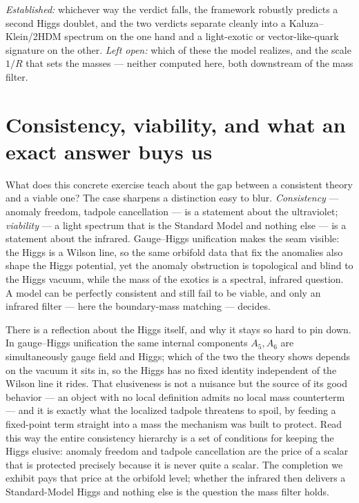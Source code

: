 \documentclass[11pt,a4paper]{article}
\begin{document}
\emph{Established:} whichever way the verdict falls, the framework robustly predicts a
second Higgs doublet, and the two verdicts separate cleanly into a Kaluza--Klein/2HDM
spectrum on the one hand and a light-exotic or vector-like-quark signature on the other.
\emph{Left open:} which of these the model realizes, and the scale $1/R$ that sets the
masses --- neither computed here, both downstream of the mass filter.

\section{Consistency, viability, and what an exact answer buys us}\label{sec:reflection}
What does this concrete exercise teach about the gap between a consistent theory and a
viable one? The case sharpens a distinction easy to blur. \emph{Consistency} --- anomaly
freedom, tadpole cancellation --- is a statement about the ultraviolet; \emph{viability}
--- a light spectrum that is the Standard Model and nothing else --- is a statement about
the infrared. Gauge--Higgs unification makes the seam visible: the Higgs is a Wilson
line, so the same orbifold data that fix the anomalies also shape the Higgs potential,
yet the anomaly obstruction is topological and blind to the Higgs vacuum, while the mass
of the exotics is a spectral, infrared question. A model can be perfectly consistent and
still fail to be viable, and only an infrared filter --- here the boundary-mass matching
--- decides.

There is a reflection about the Higgs itself, and why it stays so hard to pin down. In
gauge--Higgs unification the same internal components $A_5,A_6$ are simultaneously gauge
field and Higgs; which of the two the theory shows depends on the vacuum it sits in, so
the Higgs has no fixed identity independent of the Wilson line it rides. That elusiveness
is not a nuisance but the source of its good behavior --- an object with no local
definition admits no local mass counterterm --- and it is exactly what the localized
tadpole threatens to spoil, by feeding a fixed-point term straight into a mass the
mechanism was built to protect. Read this way the entire consistency hierarchy is a set
of conditions for keeping the Higgs elusive: anomaly freedom and tadpole cancellation are
the price of a scalar that is protected precisely because it is never quite a scalar. The
completion we exhibit pays that price at the orbifold level; whether the infrared then
delivers a Standard-Model Higgs and nothing else is the question the mass filter holds.
\end{document}
